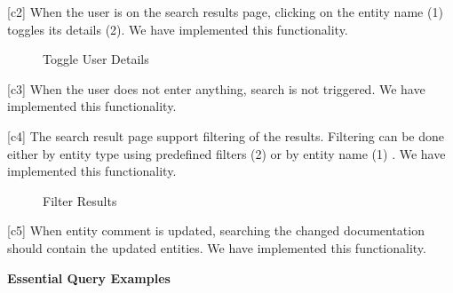 [c2] When the user is on the search results page, clicking on the entity name (1) toggles its details (2).
We have implemented this functionality.

\begin{figure}[h!t]
\begin{center}
\leavevmode
{}
\end{center}
\caption{Toggle User Details}
\label{fig:toggle_user_details}
\end{figure}


[c3] When the user does not enter anything, search is not triggered.
We have implemented this functionality.

[c4] The search result page support filtering of the results. Filtering can be done either by entity type using predefined filters (2) or by entity name (1) . 
We have implemented this functionality.
\begin{figure}[h!t]
\begin{center}
\leavevmode
{}
\end{center}
\caption{Filter Results}
\label{fig:filter_results}
\end{figure}

[c5] When entity comment is updated, searching the changed documentation should contain the updated entities.
We have implemented this functionality.

\textbf{Essential Query Examples}

